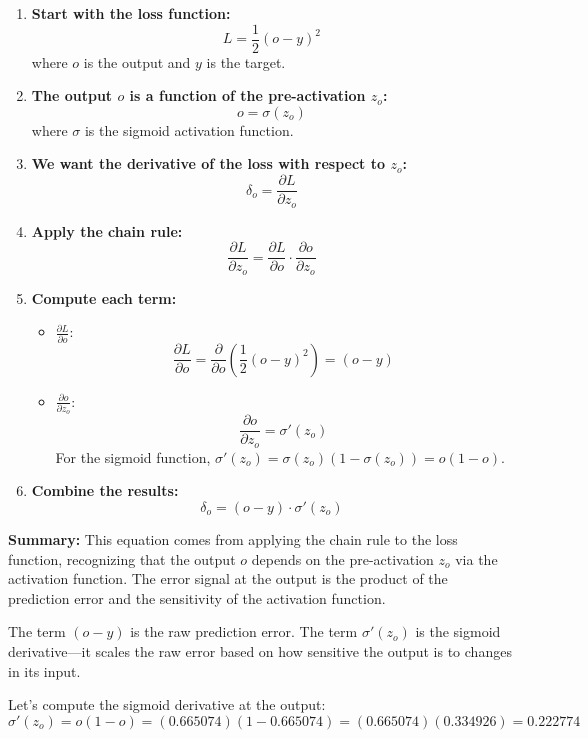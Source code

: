 \documentclass[12pt]{article}
\begin{document}
\begin{enumerate}
    \item \textbf{Start with the loss function:}
    \[
    L = \frac{1}{2}(o - y)^2
    \]
    where $o$ is the output and $y$ is the target.

    \item \textbf{The output $o$ is a function of the pre-activation $z_o$:}
    \[
    o = \sigma(z_o)
    \]
    where $\sigma$ is the sigmoid activation function.

    \item \textbf{We want the derivative of the loss with respect to $z_o$:}
    \[
    \delta_o = \frac{\partial L}{\partial z_o}
    \]

    \item \textbf{Apply the chain rule:}
    \[
    \frac{\partial L}{\partial z_o} = \frac{\partial L}{\partial o} \cdot \frac{\partial o}{\partial z_o}
    \]

    \item \textbf{Compute each term:}
    \begin{itemize}
        \item $\frac{\partial L}{\partial o}$:
        \[
        \frac{\partial L}{\partial o} = \frac{\partial}{\partial o} \left( \frac{1}{2}(o - y)^2 \right ) = (o - y)
        \]

        \item $\frac{\partial o}{\partial z_o}$:
        \[
        \frac{\partial o}{\partial z_o} = \sigma'(z_o)
        \]
        For the sigmoid function, $\sigma'(z_o) = \sigma(z_o)(1 - \sigma(z_o)) = o(1 - o)$.
    \end{itemize}

    \item \textbf{Combine the results:}
    \[
    \delta_o = (o - y) \cdot \sigma'(z_o)
    \]
\end{enumerate}

\noindent\textbf{Summary:} This equation comes from applying the chain rule to the loss function, recognizing that the output $o$ depends on the pre-activation $z_o$ via the activation function. The error signal at the output is the product of the prediction error and the sensitivity of the activation function.

The term $(o - y)$ is the raw prediction error. The term $\sigma'(z_o)$ is the sigmoid derivative—it scales the raw error based on how sensitive the output is to changes in its input.

Let's compute the sigmoid derivative at the output:
\[
\sigma'(z_o) = o(1 - o) = (0.665074)(1 - 0.665074) = (0.665074)(0.334926) = 0.222774
\]
\end{document}

